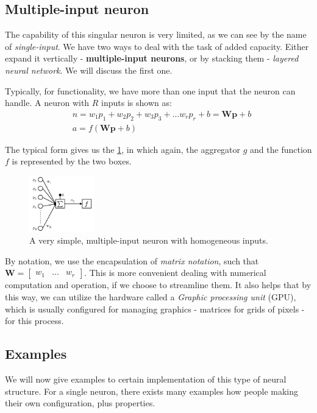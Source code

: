 \subsection{Multiple-input neuron}
The capability of this singular neuron is very limited, as we can see by the name of \textit{single-input}. We have two ways to deal with the task of added capacity. Either expand it vertically - \textbf{multiple-input neurons}, or by stacking them - \textit{layered neural network}. We will discuss the first one. 

Typically, for functionality, we have more than one input that the neuron can handle. A neuron with $R$ inputs is shown as: \begin{align}
    & n = w_{1}p_{1} + w_{2}p_{2}+w_{3}p_{3}+\dots w_{r}p_{r} + b= \mathbf{W}\mathbf{p}+b\\
    & a = f(\mathbf{Wp}+b)
\end{align}

The typical form gives us the \ref{fig:mlnet}, in which again, the aggregator $g$ and the function $f$ is represented by the two boxes.
\begin{figure}[h!]
    \centering
    \includegraphics[width=0.25\textwidth]{img/mlnet.png}
    \caption{A very simple, multiple-input neuron with homogeneous inputs.}
    \label{fig:mlnet}
\end{figure}

By notation, we use the encapsulation of \textit{matrix notation}, such that $\mathbf{W}=\begin{bmatrix}w_{1} & \dots & w_{r}\end{bmatrix}$. This is more convenient dealing with numerical computation and operation, if we choose to streamline them. It also helps that by this way, we can utilize the hardware called a \textit{Graphic processing unit} (GPU), which is usually configured for managing graphics - matrices for grids of pixels - for this process. 

\subsection{Examples}

We will now give examples to certain implementation of this type of neural structure. For a single neuron, there exists many examples how people making their own configuration, plus properties.  


